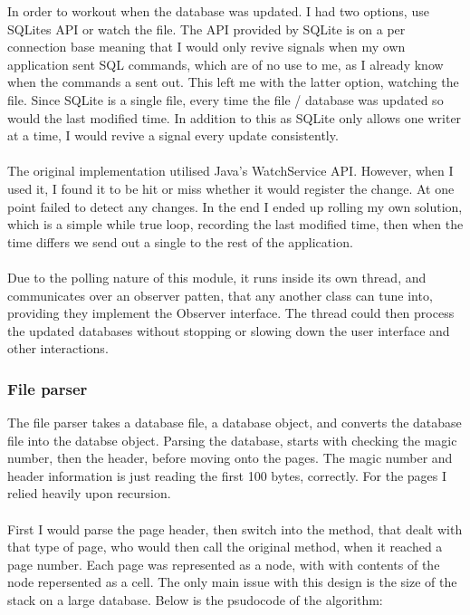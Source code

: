 In order to workout when the database was updated. I had two options, use SQLites API or watch the file. The API provided by SQLite is on a per connection base meaning that I would only revive signals when my own application sent SQL commands, which are of no use to me, as  I already know when the commands a sent out. This left me with the latter option, watching the file. Since SQLite is a single file, every time the file / database was updated so would the last modified time. In addition to this as SQLite only allows one writer at a time, I would revive a signal every update consistently.  
\\\\
The original implementation utilised Java's WatchService API. However, when I used it, I found it to be hit or miss whether it would register the change. At one point failed to detect any changes. In the end I ended up rolling my own solution, which is a simple while true loop, recording the last modified time, then when the time differs we send out a single to the rest of the application. 
\\\\
Due to the polling nature of this module, it runs inside its own thread, and communicates over an observer patten, that any another class can tune into, providing they implement the Observer interface. The thread could then process the updated databases without stopping or slowing down the user interface and other interactions.

\subsubsection{File parser}
\label{subsubsec:file_parser_imp}

The file parser takes a database file, a database object, and converts the database file into the databse object. Parsing the database, starts with checking the magic number, then the header, before moving onto the pages. The magic number and header information is just reading the first 100 bytes, correctly. For the pages I relied heavily upon recursion.
\\\\
First I would parse the page header, then switch into the method, that dealt with that type of page, who would then call the original method, when it reached a page number.  Each page was represented as a node, with with contents of the node repersented as a cell. The only main issue with this design is the size of the stack on a large database. Below is the psudocode of the algorithm:

